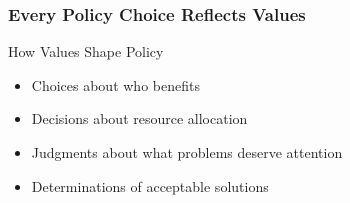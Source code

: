 \documentclass[10pt]{beamer}
\begin{document}
\begin{frame}
\frametitle{Every Policy Choice Reflects Values}

\pause
\begin{block}{How Values Shape Policy}
\begin{itemize}
\item Choices about who benefits
\item Decisions about resource allocation
\item Judgments about what problems deserve attention
\item Determinations of acceptable solutions
\end{itemize}
\end{block}

\end{frame}
\end{document}
